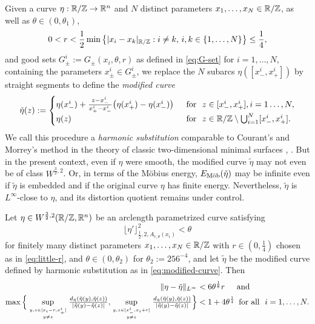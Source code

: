 Given a curve $\eta:\mathbb{R}/\mathbb{Z}\to\mathbb{R}^n$ and $N$ distinct parameters $x_1,\ldots,x_N\in
\mathbb{R}/\mathbb{Z}$, as well as $\theta\in (0,\theta_1)$, 
\begin{equation}\label{eq:little-r}
0<r<\frac12\min\big\{|x_i-x_k|_{\mathbb{R}/\mathbb{Z}}: i\not= k,\,i,k\in\{1,\ldots,N\}\big\}\le \frac14,
\end{equation}
and good sets $G_\pm^ i:=G_\pm(x_i,\theta,r)$ as defined  in \eqref{eq:G-set} for
$i=1,\ldots,N$, containing the parameters $x^i_\pm\in G_\pm^i$,
we replace the $N$ subarcs $\eta([x_-^i,x_+^i])$ by straight segments to define
the \emph{modified curve}
\begin{equation}\label{eq:modified-curve}
\tilde{\eta}(z):=\begin{cases}
\eta(x_-^i)+\frac{z-x_-^i}{x_+^i-x_-^i}\big(\eta(x_+^i)-\eta(x_-^i)\big) & \,\,\,\text{for }\,\,
z\in [x_-^i,x_+^i], i=1\ldots,N,\\
\eta(z) & \,\,\,\text{for }\,\, z\in\mathbb{R}/\mathbb{Z}\setminus\bigcup_{i=1}^N[x_-^i,x_+^i].
\end{cases}
\end{equation}
We call this procedure a \emph{harmonic substitution} comparable to Courant's and 
Morrey's  method in the theory of classic two-dimensional minimal surfaces
\cite[p. 25]{courant_1977}, \cite[Theorem~4.3.2]{morrey_1966}. But in the present
context, even if $\eta$ were smooth, the modified curve $\tilde{\eta}$ may not
even be of class $W^{\frac32,2}$. Or, in terms of the M\"obius energy, ${E_\textnormal{M\"ob}}(\tilde{\eta})$ may be infinite even if $\tilde{\eta}$ is embedded and if the original curve $\eta$
has finite energy. Nevertheless, $\tilde{\eta}$ is 
$L^\infty$-close to $\eta$, and
its distortion  quotient remains under control.
\begin{lemma}
\label{lem:harmonic-substitution}
Let $\eta\in W^{\frac32,2}(\mathbb{R}/\mathbb{Z},\mathbb{R}^n)$ be an arclength parametrized curve satisfying
\begin{equation}\label{eq:fractional-seminorm-theta3}
\lfloor \eta'\rfloor^2_{\frac12,2,A_{r,\theta}(x_i)}<\theta
\end{equation}
for 
finitely 
many distinct parameters $x_1,\ldots,x_N\in\mathbb{R}/\mathbb{Z}$ with $r\in (0,\frac14)$
chosen as in \eqref{eq:little-r},
and $\theta\in (0,\theta_2)$ for
$\theta_2:=256^{-4}$, and let $\tilde{\eta}$ be the modified curve defined
by harmonic substitution as in \eqref{eq:modified-curve}. Then
\begin{align}
\|\eta-\tilde{\eta}\|_{L^\infty}&< 6\theta^{\frac18}r\quad\,\,\,\text{and }\,\,\quad
\label{eq:linfty-dist-theta}\\
\max\Big\{\sup_{y,z\in [x_i-r,x_+^i]\atop y\not= z}{\textstyle\frac{d_{\tilde{\eta}}(\tilde{\eta}(y),\tilde{\eta}(z))}{|\tilde{\eta}(y)-
\tilde{\eta}(z)|},}\sup_{y,z\in [x_-^i,x_i+r]\atop y\not= z}
{\textstyle\frac{d_{\tilde{\eta}}(\tilde{\eta}(y),\tilde{\eta}(z))}{|\tilde{\eta}(y)-
\tilde{\eta}(z)|}}\Big\}&<1+4\theta^\frac14\,\,\,\text{for all }\,\, i=1,\ldots,N.\notag
\end{align}
\end{lemma}
